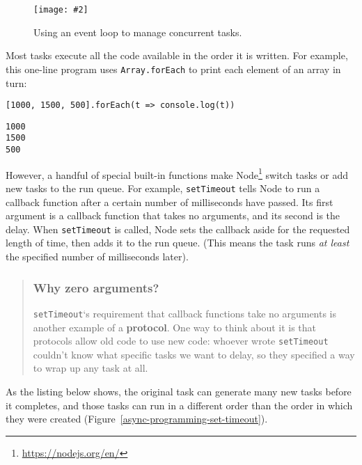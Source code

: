 \documentclass[krantzl]{krantz}
\newcommand{\figpdf}[4]{\begin{figure}%
\centering%
\texttt{[image: \#2]}%
\caption{#3}%
\label{#1}%
\end{figure}}
\newcommand{\figref}[1]{Figure~\ref{#1}}
\newcommand{\glossref}[1]{\textbf{#1}}
\newenvironment{callout}{\savenotes\begin{tBox}\begin{quotation}\toggletrue{inbox}\renewcommand{\thempfootnote}{\arabic{footnote}}}{\end{quotation}\vspace{\baselineskip}\end{tBox}\togglefalse{inbox}\spewnotes}
\newcommand{\hreffoot}[2]{{#1}\footnote{\href{#2}{#2}}}
\begin{document}
\figpdf{async-programming-event-loop}{./async-programming/event-loop.pdf}{Using an event loop to manage concurrent tasks.}{0.6}


Most tasks execute all the code available in the order it is written.
For example,
this one-line program uses \texttt{Array.forEach}
to print each element of an array in turn:


\begin{lstlisting}[frame=tblr]
[1000, 1500, 500].forEach(t => console.log(t))
\end{lstlisting}



\begin{lstlisting}[frame=tblr,backgroundcolor=\color{black!5}]
1000
1500
500
\end{lstlisting}



However,
a handful of special built-in functions make \hreffoot{Node}{https://nodejs.org/en/} switch tasks
or add new tasks to the run queue.
For example,
\texttt{setTimeout} tells Node to run a callback function
after a certain number of milliseconds have passed.
Its first argument is a callback function that takes no arguments,
and its second is the delay.
When \texttt{setTimeout} is called,
Node sets the callback aside for the requested length of time,
then adds it to the run queue.
(This means the task runs \emph{at least} the specified number of milliseconds later).

\begin{callout}


\subsubsection*{Why zero arguments?}


\texttt{setTimeout}‘s requirement that callback functions take no arguments
is another example of a \glossref{protocol}.
One way to think about it is that protocols allow old code to use new code:
whoever wrote \texttt{setTimeout} couldn’t know what specific tasks we want to delay,
so they specified a way to wrap up any task at all.

\end{callout}


As the listing below shows,
the original task can generate many new tasks before it completes,
and those tasks can run in a different order than the order in which they were created
(\figref{async-programming-set-timeout}).
\end{document}
